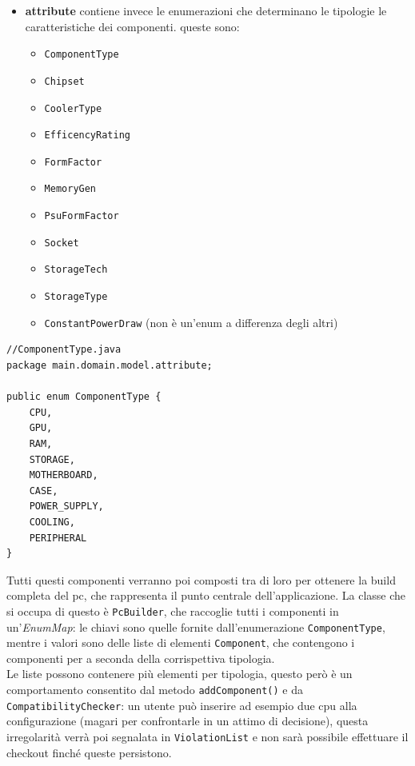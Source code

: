 \documentclass[12pt,a4paper]{article}
\begin{document}
\begin{itemize}
\item \textbf{attribute} contiene invece le enumerazioni che determinano le tipologie le caratteristiche dei componenti. queste sono:
\begin{itemize}
\item \texttt{ComponentType}
\item \texttt{Chipset}
\item \texttt{CoolerType}
\item \texttt{EfficencyRating}
\item \texttt{FormFactor}
\item \texttt{MemoryGen}
\item \texttt{PsuFormFactor}
\item \texttt{Socket}
\item \texttt{StorageTech}
\item \texttt{StorageType}
\item \texttt{ConstantPowerDraw} (non è un'enum a differenza degli altri)
\end{itemize}
\end{itemize}

\begin{lstlisting}[style=intellijlight, caption={A simple Java class}, label={lst:hello}]
//ComponentType.java
package main.domain.model.attribute;

public enum ComponentType {
    CPU,
    GPU,
    RAM,
    STORAGE,
    MOTHERBOARD,
    CASE,
    POWER_SUPPLY,
    COOLING,
    PERIPHERAL
}
\end{lstlisting}

Tutti questi componenti verranno poi composti tra di loro per ottenere la build completa del pc, che rappresenta il punto centrale dell'applicazione. La classe che si occupa di questo è \texttt{PcBuilder}, che raccoglie tutti i componenti in un'\textit{EnumMap}: le chiavi sono quelle fornite dall'enumerazione \texttt{ComponentType}, mentre i valori sono delle liste di elementi \texttt{Component}, che contengono i componenti per a seconda della corrispettiva tipologia.\\
Le liste possono contenere più elementi per tipologia, questo però è un comportamento consentito dal metodo \texttt{addComponent()} e da \texttt{CompatibilityChecker}: un utente può inserire ad esempio due cpu alla configurazione (magari per confrontarle in un attimo di decisione), questa irregolarità verrà poi segnalata in \texttt{ViolationList} e non sarà possibile effettuare il checkout finché queste persistono.
\end{document}
